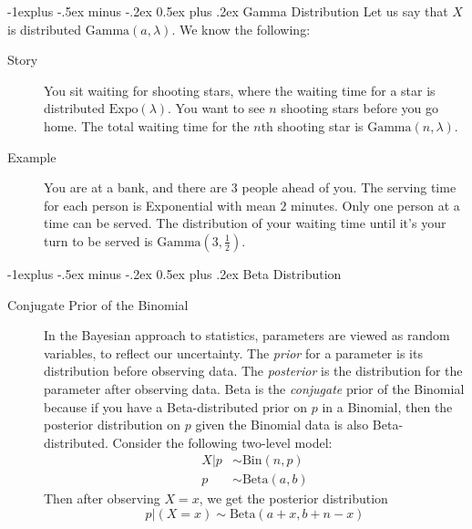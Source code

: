 \documentclass[10pt,landscape]{article}
\makeatletter
\newcommand{\Bin}{\textrm{Bin}}
\newcommand{\Beta}{\textrm{Beta}}
\newcommand{\Gam}{\textrm{Gamma}}
\newcommand{\Expo}{\textrm{Expo}}
\renewcommand{\subsection}{\@startsection{subsection}{2}{0mm}%
                                {-1explus -.5ex minus -.2ex}%
                                {0.5ex plus .2ex}%
                                {\normalfont\normalsize\bfseries}}
\makeatother
\begin{document}
\begin{multicols*}{3}
\subsection{Gamma Distribution}
Let us say that $X$ is distributed $\Gam(a, \lambda)$. We know the following:
\begin{description}
    \item[Story] You sit waiting for shooting stars, where the waiting time for a star is distributed $\Expo(\lambda)$. You want to see $n$ shooting stars before you go home. The total waiting time for the $n$th shooting star is $\Gam(n,\lambda)$.
    \item[Example]  You are at a bank, and there are 3 people ahead of you. The serving time for each person is Exponential with mean $2$ minutes. Only one person at a time can be served. The distribution of your waiting time until it's your turn to be served is $\Gam(3, \frac{1}{2})$.

\end{description}

\subsection{Beta Distribution}

\begin{description}

\item[Conjugate Prior of the Binomial] In the Bayesian approach to statistics, parameters are viewed as random variables, to reflect our uncertainty. The \emph{prior} for a parameter is its distribution before observing data. The \emph{posterior}  is the distribution for the parameter after observing data. Beta is the \emph{conjugate} prior of the Binomial because if you have a Beta-distributed prior on $p$ in a Binomial, then the posterior distribution on $p$ given the Binomial data is also Beta-distributed. Consider the following two-level model:
    \begin{align*}
        X|p &\sim \Bin(n, p) \\
        p &\sim \Beta(a, b)
    \end{align*}
Then after observing  $X = x$, we get the posterior distribution
\[p|(X=x) \sim \Beta(a + x, b + n - x) \]


\end{description}
\end{multicols*}
\end{document}
